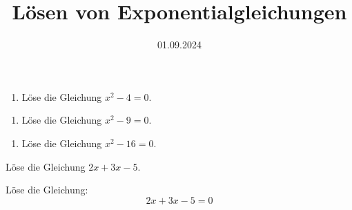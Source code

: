 \documentclass[points=left, 
solution,
textsize=14pt,
mathsize=16pt,
boxoffset=0.67cm
]{exam}
\date{01.09.2024}
\title{Lösen von Exponentialgleichungen}
\begin{document}

\lipsum[1]

\begin{enumerate}[label=\alph*)]
    \item Löse die Gleichung \(x^2 - 4 = 0\). \\
\end{enumerate}


\begin{enumerate}[label=\alph*), resume]
    \item Löse die Gleichung \(x^2 - 9 = 0\).
\end{enumerate}


\begin{enumerate}[label=\alph*), resume]
    \item Löse die Gleichung \(x^2 - 16 = 0\).
\end{enumerate}



\lipsum[1]

Löse die Gleichung \(2x + 3x - 5\).

Löse die Gleichung:
\[
    2x + 3x - 5 = 0
\]
\thinkbubble[Test]


\totalpoints
\end{document}
